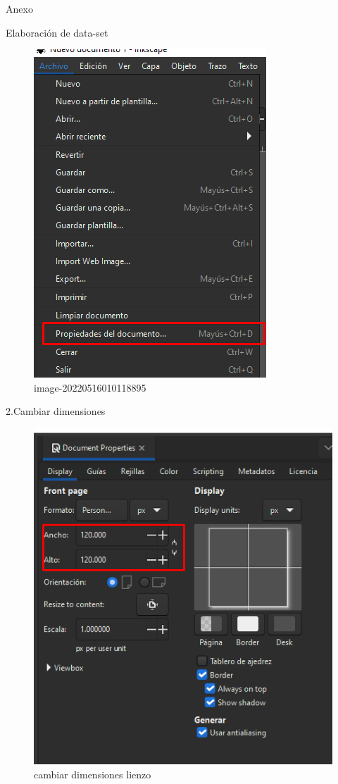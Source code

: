 \documentclass[
  spanish,
  ignorenonframetext,
]{beamer}
\begin{document}
\begin{frame}{Anexo}
\begin{block}{Elaboración de data-set}
\begin{figure}
\centering
\includegraphics{img/README/image-20220516010118895.png}
\caption{image-20220516010118895}
\end{figure}

2.Cambiar dimensiones

\begin{figure}
\centering
\includegraphics{img/README/image-20220516010209321.png}
\caption{cambiar dimensiones lienzo}
\end{figure}
\end{block}
\end{frame}
\end{document}
